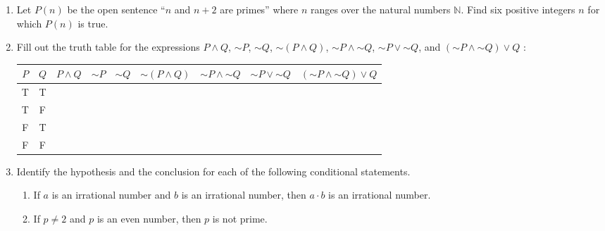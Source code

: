 \documentclass[12pt]{article}
\newcommand{\NN}{{\mathbb N}}  %
\newcommand{\lsim}{\mathord{\sim}}  %
\begin{document}
\begin{enumerate}
\item  Let $P(n)$ be the open sentence ``$n$ and $n+2$ are primes'' where $n$ ranges over the natural numbers $\NN$.
       Find six positive integers $n$ for which $P(n)$ is true.

\item Fill out the truth table for the expressions
  $P\land Q$, $\lsim P$, $\lsim Q$, $\lsim(P\land Q)$, $\lsim P\land\lsim Q$, $\lsim P\lor\lsim Q$, and 
   $(\lsim P\land\lsim Q)\lor Q$ :

  \begin{tabular}{|c|c||c|c|c|c|c|c|c|}\hline
    $P$&$Q$&$P\land Q$&$\lsim P$& $\lsim Q$& $\lsim(P\land Q)$& $\lsim P\land\lsim Q$& $\lsim P\lor\lsim Q$
      &  $(\lsim P\land\lsim Q)\lor Q$\\ \hline\hline
     T &T&&&&&&&\\\hline
     T &F&&&&&&&\\\hline
     F &T&&&&&&&\\\hline
     F &F&&&&&&&\\\hline
    \end{tabular}\medskip

 \item  Identify the hypothesis and the conclusion for each of the following conditional statements.
  \begin{enumerate}
   \item If $a$ is an irrational number and $b$ is an irrational number, then $a\cdot b$ is an irrational number.
   \item If $p \neq 2$ and $p$ is an even number, then $p$ is not prime.
  \end{enumerate}



\end{enumerate}
\end{document}
